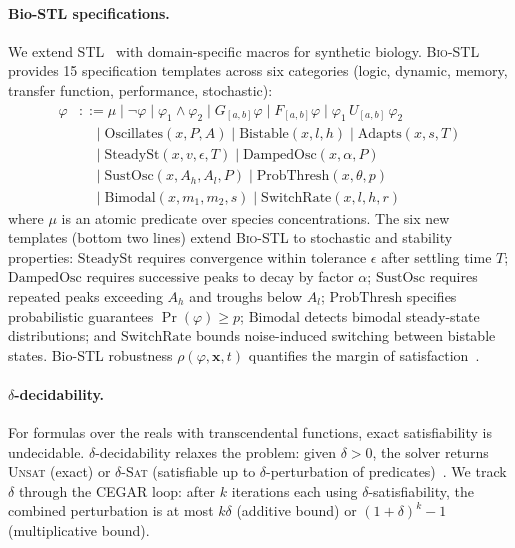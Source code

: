 \documentclass[11pt]{article}
\newcommand{\cegar}{\textsc{CEGAR}}
\newcommand{\stl}{\textsc{STL}}
\newcommand{\biostl}{\textsc{Bio-STL}}
\begin{document}
\paragraph{Bio-STL specifications.}
We extend \stl{}~\cite{maler2004monitoring} with domain-specific
macros for synthetic biology. \biostl{} provides 15 specification
templates across six categories (logic, dynamic, memory, transfer
function, performance, stochastic):
\begin{align*}
  \varphi &::= \mu \mid \neg\varphi \mid \varphi_1 \land \varphi_2
           \mid G_{[a,b]}\varphi \mid F_{[a,b]}\varphi
           \mid \varphi_1\,U_{[a,b]}\,\varphi_2 \\
  &\quad\mid \text{Oscillates}(x, P, A) \mid \text{Bistable}(x, l, h)
   \mid \text{Adapts}(x, s, T) \\
  &\quad\mid \text{SteadySt}(x, v, \epsilon, T)
   \mid \text{DampedOsc}(x, \alpha, P) \\
  &\quad\mid \text{SustOsc}(x, A_h, A_l, P)
   \mid \text{ProbThresh}(x, \theta, p) \\
  &\quad\mid \text{Bimodal}(x, m_1, m_2, s)
   \mid \text{SwitchRate}(x, l, h, r)
\end{align*}
where $\mu$ is an atomic predicate over species concentrations.
The six new templates (bottom two lines) extend \biostl{} to
stochastic and stability properties: $\text{SteadySt}$ requires
convergence within tolerance $\epsilon$ after settling time $T$;
$\text{DampedOsc}$ requires successive peaks to decay by factor
$\alpha$; $\text{SustOsc}$ requires repeated peaks exceeding $A_h$
and troughs below $A_l$; $\text{ProbThresh}$ specifies probabilistic
guarantees $\Pr(\varphi) \geq p$; $\text{Bimodal}$ detects bimodal
steady-state distributions; and $\text{SwitchRate}$ bounds
noise-induced switching between bistable states.
Bio-STL robustness $\rho(\varphi, \mathbf{x}, t)$
quantifies the margin of satisfaction~\cite{donze2013efficient}.

\paragraph{$\delta$-decidability.}
For formulas over the reals with transcendental functions,
exact satisfiability is undecidable. $\delta$-decidability
relaxes the problem: given $\delta > 0$, the solver returns
\textsc{Unsat} (exact) or $\delta$\textsc{-Sat} (satisfiable up to
$\delta$-perturbation of predicates)~\cite{gao2013dreal}. We track
$\delta$ through the \cegar{} loop: after $k$ iterations each using
$\delta$-satisfiability, the combined perturbation is at most
$k\delta$ (additive bound) or $(1+\delta)^k - 1$ (multiplicative
bound).
\end{document}
